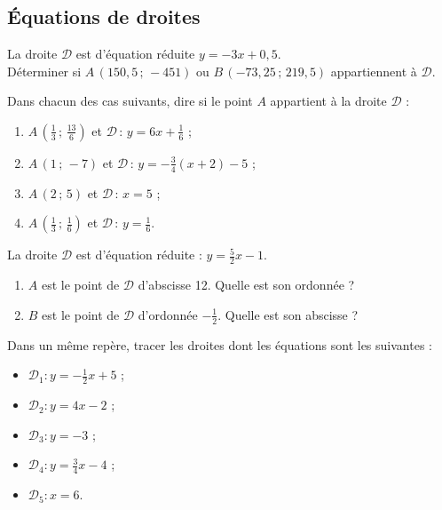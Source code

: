 \subsection{\'Equations de droites}
\begin{exo}
La droite $\mathcal{D}$ est d'équation réduite $y=-3x+0,5$.\\ Déterminer si $A\,(150,5\,;\,-451)$ ou $B\,(-73,25\,;\,219,5)$ appartiennent à $\mathcal{D}$.
\end{exo}

\begin{exo}
Dans chacun des cas suivants, dire si le point $A$ appartient à la droite $\mathcal{D}$ :
\vspace{-1em}\begin{multicols}{2}\begin{enumerate}
	\item $A\,\left(\frac{1}{3}\,;\,\frac{13}{6}\right)$ et $\mathcal{D}\,:\, y=6x+\frac{1}{6}$ ;
	\item $A\,(1\,;\,-7)$ et $\mathcal{D}\,:\, y=-\frac{3}{4}(x+2)-5$ ;%
	\item $A\,(2\,;\,5)$ et $\mathcal{D}\,:\, x=5$ ;%
	\item $A\,\left(\frac{1}{3}\,;\,\frac{1}{6}\right)$ et $\mathcal{D}\,:\, y=\frac{1}{6}$.
\end{enumerate}\end{multicols}\vspace{-1em}
\end{exo}

\begin{exo}
La droite $\mathcal{D}$ est d'équation réduite : $y=\frac{5}{2}x-1$.
\begin{enumerate}
	\item $A$ est le point de $\mathcal{D}$ d'abscisse 12. Quelle est son ordonnée ?
	\item $B$ est le point de $\mathcal{D}$ d'ordonnée $-\frac{1}{2}$. Quelle est son abscisse ?
\end{enumerate}
\end{exo}

\begin{exo}
Dans un même repère, tracer les droites dont les équations sont les suivantes :
\vspace{-1em}\begin{multicols}{3}\begin{itemize}
	\item $\mathcal{D}_1:y=-\frac{1}{2}x+5$ ;
	\item $\mathcal{D}_2:y=4x-2$ ;%
	\item $\mathcal{D}_3:y=-3$ ;%
	\item $\mathcal{D}_4:y=\frac{3}{4}x-4$ ;%
	\item $\mathcal{D}_5:x=6$.
\end{itemize}\end{multicols}\vspace{-1em}
\end{exo}

